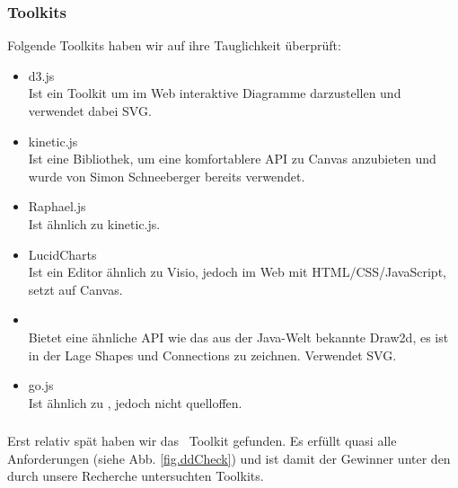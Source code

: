\subsubsection{Toolkits}

Folgende Toolkits haben wir auf ihre Tauglichkeit überprüft:

\begin{itemize}
  \item d3.js \\
  Ist ein Toolkit um im Web interaktive Diagramme darzustellen und
  verwendet dabei SVG.
  \item kinetic.js \\
  Ist eine Bibliothek, um eine komfortablere API zu Canvas anzubieten
  und wurde von Simon Schneeberger bereits verwendet.
  \item Raphael.js \\
  Ist ähnlich zu kinetic.js.
  \item LucidCharts \\
  Ist ein Editor ähnlich zu Visio, jedoch im Web mit HTML/CSS/JavaScript,
  setzt auf Canvas.
  \item \dd \\
  Bietet eine ähnliche API wie das aus der Java-Welt bekannte Draw2d,
  es ist in der Lage Shapes und Connections zu zeichnen.
  Verwendet SVG.
  \item go.js \\
  Ist ähnlich zu \dd, jedoch nicht quelloffen.
\end{itemize}

\subsubsection{\dd}

Erst relativ spät haben wir das \dd~Toolkit gefunden.
Es erfüllt quasi alle Anforderungen (siehe Abb. \ref{fig.ddCheck})
und ist damit der Gewinner unter den
durch unsere Recherche untersuchten Toolkits.

